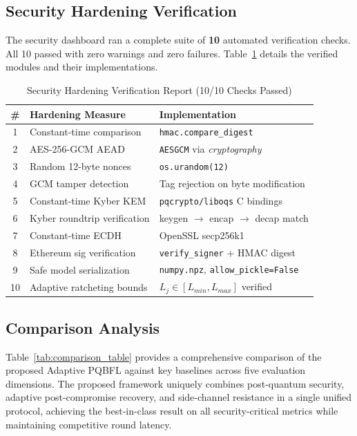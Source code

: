\documentclass[journal, 10pt, twocolumn]{IEEEtran}
\begin{document}
\subsection{Security Hardening Verification}
The security dashboard ran a complete suite of \textbf{10} automated verification checks. All 10 passed with zero warnings and zero failures. Table~\ref{tab:security_checks} details the verified modules and their implementations.

\begin{table}
\centering
\caption{Security Hardening Verification Report (10/10 Checks Passed)}
\label{tab:security_checks}
\begin{tabular}{c l l}
\toprule
\textbf{\#} & \textbf{Hardening Measure} & \textbf{Implementation} \\
\midrule
1  & Constant-time comparison     & \texttt{hmac.compare\_digest} \\
2  & AES-256-GCM AEAD             & \texttt{AESGCM} via \textit{cryptography} \\
3  & Random 12-byte nonces        & \texttt{os.urandom(12)} \\
4  & GCM tamper detection         & Tag rejection on byte modification \\
5  & Constant-time Kyber KEM      & \texttt{pqcrypto/liboqs} C bindings \\
6  & Kyber roundtrip verification & keygen $\to$ encap $\to$ decap match \\
7  & Constant-time ECDH           & OpenSSL secp256k1 \\
8  & Ethereum sig verification    & \texttt{verify\_signer} + HMAC digest \\
9  & Safe model serialization     & \texttt{numpy.npz}, \texttt{allow\_pickle=False} \\
10 & Adaptive ratcheting bounds   & $L_j \in [L_{min}, L_{max}]$ verified \\
\bottomrule
\end{tabular}
\end{table}

\subsection{Comparison Analysis}
Table~\ref{tab:comparison_table} provides a comprehensive comparison of the proposed Adaptive PQBFL against key baselines across five evaluation dimensions. The proposed framework uniquely combines post-quantum security, adaptive post-compromise recovery, and side-channel resistance in a single unified protocol, achieving the best-in-class result on all security-critical metrics while maintaining competitive round latency.
\end{document}
